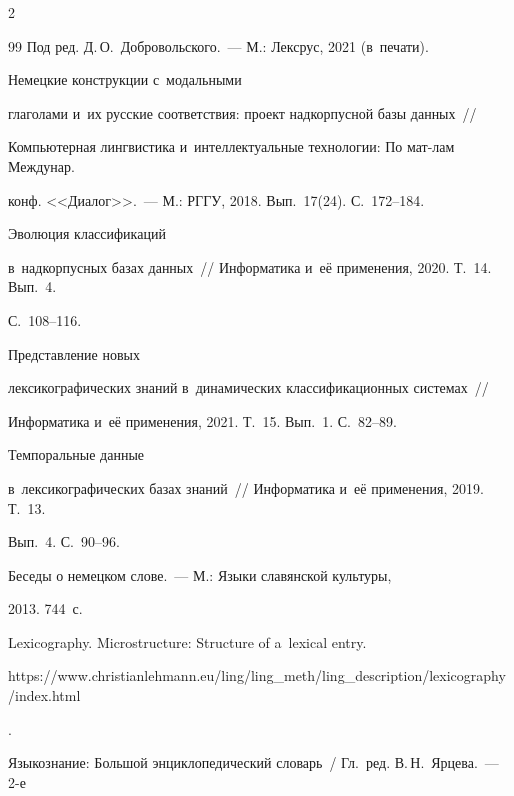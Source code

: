 \begin{multicols}{2}
{{\begin{thebibliography}{99}
Под ред. Д.\,О.~Добровольского.~--- М.: Лексрус, 2021 (в~пе\-чати).




 Немецкие конструкции с~модальными 


глаголами и~их русские соответствия: проект надкорпусной базы данных~//\linebreak 


Компьютерная лингвистика и~интеллектуальные технологии: По мат-лам Междунар. 


конф. <<Диалог>>.~--- М.: РГГУ, 2018. Вып.~17(24). С.~172--184.




 Эволюция классификаций 


в~надкорпусных базах данных~// Информатика и~её применения, 2020. Т.~14. Вып.~4. 


С.~108--116.




 Пред\-став\-ле\-ние новых 


лексикографических знаний в~динамических классификационных системах~// 


Информатика и~её применения, 2021. Т.~15. Вып.~1. С.~82--89.




 Темпоральные данные 


в~лексикографических базах знаний~// Информатика и~её применения, 2019. Т.~13. 


Вып.~4. С.~90--96.




 Беседы о немецком слове.~--- М.: Языки славянской культуры, 


2013. 744~с.




 Lexicography. Microstructure: Structure of a~lexical entry. {\sf 


https://www.\linebreak christianlehmann.eu/ling/ling\_meth/ling\_description/\linebreak lexicography/index.html}.




Языкознание: Большой энциклопедический словарь~/ Гл.\ ред. В.\,Н.~Ярцева.~---  2-е 



\end{thebibliography}}}
\end{multicols}

